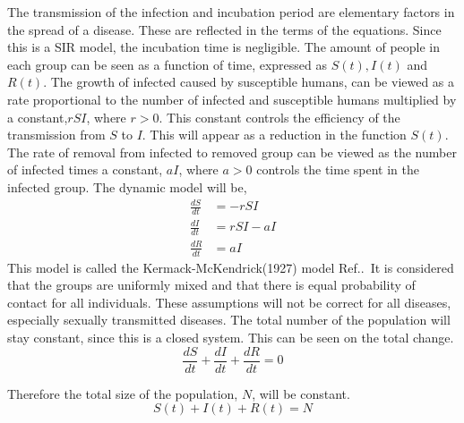 \documentclass[%
twoside,                 %
final,                   %
chapterprefix=true,      %
open=right               %
10pt]{book}
\begin{document}
\vspace{3mm}




\vspace{3mm}


The transmission of the infection and incubation period are elementary factors in the spread of a disease. These are reflected in the terms of the equations. Since this is a SIR model, the incubation time is negligible. The amount of people in each group can be seen as a function of time, expressed as $S(t),I(t)$ and $R(t)$. The growth of infected caused by susceptible humans, can be viewed as a rate proportional to the number of infected and susceptible humans multiplied by a constant,$rSI$, where $r>0$. This constant controls the efficiency of the transmission from $S$ to $I$. This will appear as a reduction in the function $S(t)$. The rate of removal from infected to removed group can be viewed as the number of infected times a constant, $aI$, where $a>0$ controls the time spent in the infected group. The dynamic model will be,
\begin{equation} \label{eq:SIR_model}
	\begin{aligned} 
	\frac{dS}{dt} &= -rSI \\ 
	\frac{dI}{dt} &= rSI-aI \\ 
	\frac{dR}{dt} &= aI 
	\end{aligned}
\end{equation}
This model is called the Kermack-McKendrick(1927) model Ref.\cite[p.~320]{murray2002mathematical}.~It is considered that the groups are uniformly mixed and that there is equal probability of contact for all individuals. These assumptions will not be correct for all diseases, especially sexually transmitted diseases. The total number of the population will stay constant, since this is a closed system. This can be seen on the total change.
\begin{equation}
\frac{dS}{dt} + \frac{dI}{dt} + \frac{dR}{dt} = 0
\end{equation}

Therefore the total size of the population, $N$, will be constant. 
\begin{equation} \label{eq:SIR_N}
S(t)+I(t)+R(t) = N
\end{equation}
\end{document}
